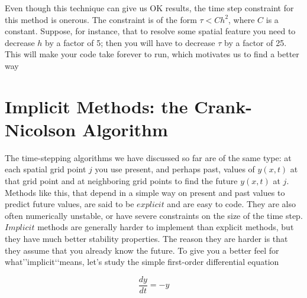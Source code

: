 \documentclass{book}
\theoremstyle{plain}
\theoremstyle{definition}
\numberwithin{exm}{chapter}
\theoremstyle{remark}
\theoremstyle{summary}
\theoremstyle{overview}
\begin{document}
Even though this technique can give us OK results, the time step constraint for this
method is onerous. The constraint is of the form $\tau < C h^2$, where $C$ is a constant.
Suppose, for instance, that to resolve some spatial feature you need to decrease $h$
by a factor of 5; then you will have to decrease $\tau$ by a factor of 25. This will make
your code take forever to run, which motivates us to find a better way

\section*{Implicit Methods: the Crank-Nicolson Algorithm}

The time-stepping algorithms we have discussed so far are of the same type: at
each spatial grid point $j$ you use present, and perhaps past, values of $y(x,t)$ at that
grid point and at neighboring grid points to find the future $y(x,t)$ at $j$. Methods
like this, that depend in a simple way on present and past values to predict future
values, are said to be $explicit$ and are easy to code. They are also often numerically
unstable, or have severe constraints on the size of the time step.\\
$Implicit$ methods are generally harder to implement than explicit methods,
but they have much better stability properties. The reason they are harder is that
they assume that you already know the future. To give you a better feel for what\rq\rq implicit\lq\lq means, let\rq s study the simple first-order differential equation

\begin{equation}\label{eq:713}
\frac{dy}{dt	} = -y
\end{equation}
\end{document}
